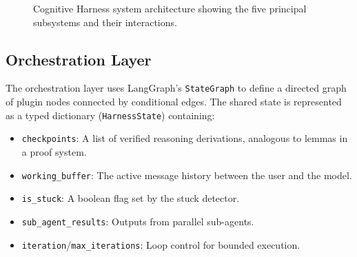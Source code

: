 \documentclass[conference]{IEEEtran}
\begin{document}
\begin{figure}[htbp]
\centerline{
}
\caption{Cognitive Harness system architecture showing the five principal subsystems and their interactions.}
\label{fig:architecture}
\end{figure}

\subsection{Orchestration Layer}

The orchestration layer uses LangGraph's \texttt{StateGraph} to define a directed graph of plugin nodes connected by conditional edges. The shared state is represented as a typed dictionary (\texttt{HarnessState}) containing:

\begin{itemize}
    \item \texttt{checkpoints}: A list of verified reasoning derivations, analogous to lemmas in a proof system.
    \item \texttt{working\_buffer}: The active message history between the user and the model.
    \item \texttt{is\_stuck}: A boolean flag set by the stuck detector.
    \item \texttt{sub\_agent\_results}: Outputs from parallel sub-agents.
    \item \texttt{iteration}/\texttt{max\_iterations}: Loop control for bounded execution.
\end{itemize}
\end{document}
